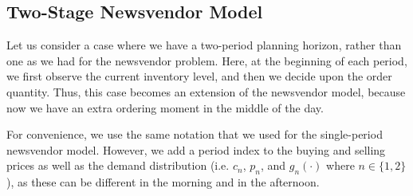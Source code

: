 \subsection{Two-Stage Newsvendor Model}

Let us consider a case where we have a two-period planning horizon, rather than one as we had for the newsvendor problem. Here, at the beginning of each period, we  first observe the current inventory level, and then we decide upon the order quantity. Thus, this case  becomes an extension of the newsvendor model, because now we have an extra ordering moment in the middle of the day. 

For convenience, we use the same notation that we used for the single-period newsvendor model. However, we add a period index to the buying and selling prices as well as the demand distribution (i.e. $c_n$, $p_n$, and $g_n(\cdot)$ where $n\in\{1,2\}$), as these can be different in the morning and in the afternoon.

